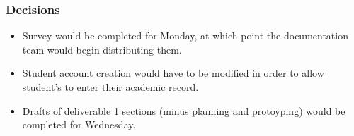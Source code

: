 \documentclass[paper=a4, fontsize=11pt]{scrartcl}
\begin{document}
\subsubsection*{Decisions}
\begin{itemize}
    \item Survey would be completed for Monday, at which point the documentation
    team would begin distributing them.
    \item Student account creation would have to be modified in order to allow
    student's to enter their academic record.
    \item Drafts of deliverable 1 sections (minus planning and protoyping) would be
    completed for Wednesday.
\end{itemize}

\subsection*{\color{red}{Next Meeting: Friday February 5}}
\end{document}
